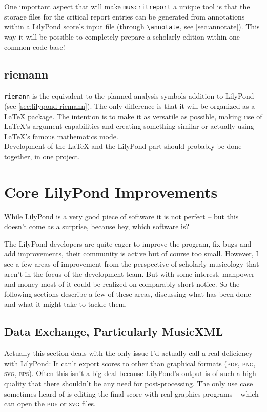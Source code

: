 \documentclass[oneside]{OLLbook}
\begin{document}
One important aspect that will make \texttt{muscritreport} a unique tool is that the storage files for the critical report entries can be generated from annotations within a LilyPond score's input file (through \texttt{\textbackslash annotate}, see \ref{sec:annotate}).
This way it will be possible to completely prepare a scholarly edition within one common code base!

\section{riemann}\label{sec:latex-riemann}
\texttt{riemann} is the equivalent to the planned analysis symbols addition to LilyPond (see \ref{sec:lilypond-riemann}).
The only difference is that it will be organized as a \LaTeX{} package.
The intention is to make it as versatile as possible, making use of \LaTeX's argument capabilities and creating something similar or actually using \LaTeX's famous mathematics mode.\\
Development of the \LaTeX{} and the LilyPond part should probably be done together, in one project.

\chapter{Core LilyPond Improvements}\label{sec:core-lilypond-improvements}
While LilyPond is a very good piece of software it is not perfect -- but this doesn't come as a surprise, because hey, which software is?

The LilyPond developers are quite eager to improve the program, fix bugs and add improvements, their community is active but of course too small.
However, I see a few areas of improvement from the perspective of scholarly musicology that aren't in the focus of the development team.
But with some interest, manpower and money most of it could be realized on comparably short notice.
So the following sections describe a few of these areas, discussing what has been done and what it might take to tackle them.

\section{Data Exchange, Particularly MusicXML}\label{sec:export-to-musicxml}
Actually this section deals with the only issue I'd actually call a real deficiency with LilyPond: It can't export scores to other than graphical formats (\textsc{pdf, png, svg, eps}).
Often this isn't a big deal because LilyPond's output is of such a high quality that there shouldn't be any need for post-processing.
The only use case sometimes heard of is editing the final score with real graphics programs -- which can open the \textsc{pdf} or \textsc{svg} files.
\end{document}
